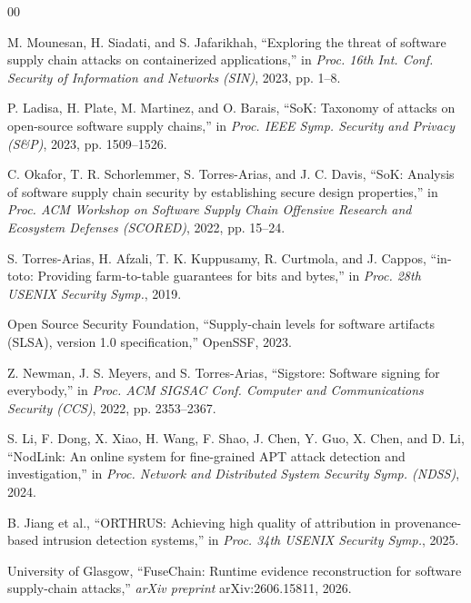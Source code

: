 \documentclass[conference]{IEEEtran}
\begin{document}
\begin{thebibliography}{00}

 M. Mounesan, H. Siadati, and S. Jafarikhah,
``Exploring the threat of software supply chain attacks on
containerized applications,'' in \textit{Proc. 16th Int. Conf. Security
of Information and Networks (SIN)}, 2023, pp. 1--8.


 P. Ladisa, H. Plate, M. Martinez, and O. Barais,
``SoK: Taxonomy of attacks on open-source software supply chains,'' in
\textit{Proc. IEEE Symp. Security and Privacy (S\&P)}, 2023,
pp. 1509--1526.

 C. Okafor, T. R. Schorlemmer, S. Torres-Arias, and
J. C. Davis, ``SoK: Analysis of software supply chain security by
establishing secure design properties,'' in \textit{Proc. ACM Workshop
on Software Supply Chain Offensive Research and Ecosystem Defenses
(SCORED)}, 2022, pp. 15--24.

 S. Torres-Arias, H. Afzali, T. K. Kuppusamy,
R. Curtmola, and J. Cappos, ``in-toto: Providing farm-to-table
guarantees for bits and bytes,'' in \textit{Proc. 28th USENIX Security
Symp.}, 2019.

 Open Source Security Foundation, ``Supply-chain
levels for software artifacts (SLSA), version 1.0 specification,''
OpenSSF, 2023.

 Z. Newman, J. S. Meyers, and S. Torres-Arias,
``Sigstore: Software signing for everybody,'' in \textit{Proc. ACM
SIGSAC Conf. Computer and Communications Security (CCS)}, 2022,
pp. 2353--2367.

 S. Li, F. Dong, X. Xiao, H. Wang, F. Shao,
J. Chen, Y. Guo, X. Chen, and D. Li, ``NodLink: An online system for
fine-grained APT attack detection and investigation,'' in \textit{Proc.
Network and Distributed System Security Symp. (NDSS)}, 2024.

 B. Jiang et al., ``ORTHRUS: Achieving high
quality of attribution in provenance-based intrusion detection
systems,'' in \textit{Proc. 34th USENIX Security Symp.}, 2025.

 University of Glasgow, ``FuseChain: Runtime
evidence reconstruction for software supply-chain attacks,''
\textit{arXiv preprint} arXiv:2606.15811, 2026.


\end{thebibliography}
\end{document}
